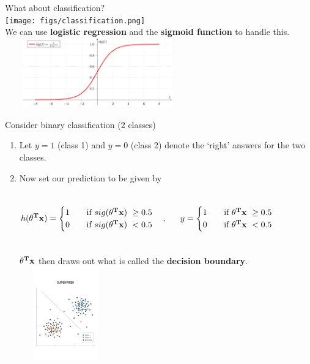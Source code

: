 \documentclass[usenames,dvipsnames]{beamer}
\begin{document}
\begin{frame}
What about classification? \\ 
\centering
    \texttt{[image: figs/classification.png]} \\ \pause
We can use {\bf logistic regression} and the {\bf sigmoid function} to handle this. \\
    \includegraphics[width=8cm,height=3cm]{figs/sigmoid.png} \\

\end{frame}


\begin{frame}
Consider binary classification  (2 classes) 
\begin{enumerate}
\item 
Let $y=1$ (class 1) and $y=0$ (class 2)  denote the `right' answers for the two classes. 
\item
Now set our prediction to be given by  

\begin{columns}
\column{5cm}
 \[   
h({\bf \theta^T x}) = 
     \begin{cases}
       1 &\quad\text{if $sig({\bf \theta^T x})$ } \ge 0.5 \\
       0 &\quad\text{if $sig({\bf \theta^T x})$ }  < 0.5 \\
     \end{cases} \quad ,
\]

\column{5cm} 
 \[   
y = 
     \begin{cases}
       1 &\quad\text{if ${\bf \theta^T x}$ } \ge 0.5 \\
       0 &\quad\text{if ${\bf \theta^T x}$ }  < 0.5 \\
     \end{cases}
\]
\end{columns}
\pause
${\bf \theta^T x}$ then draws out what is called the {\bf decision boundary}. 
\centering
    \includegraphics[width=4cm,height=4cm]{figs/supervised.pdf} \\

\end{enumerate}
\end{frame}
\end{document}
